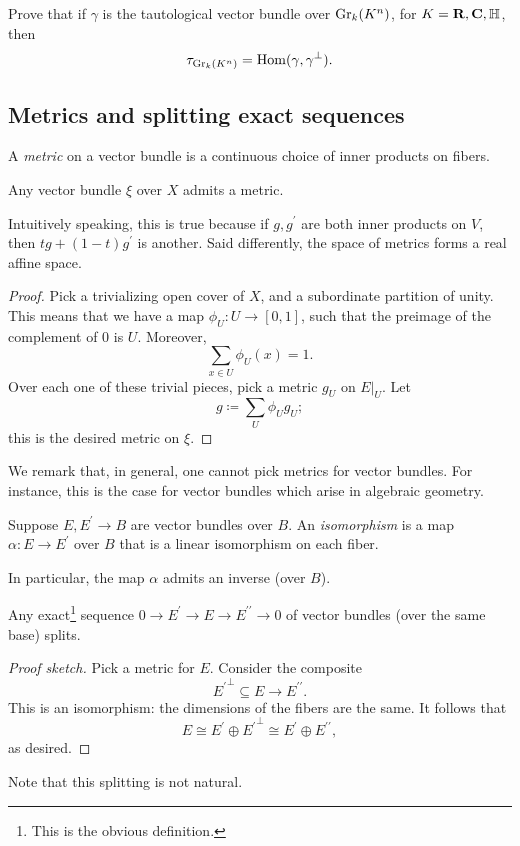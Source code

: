 \begin{exercise}
    Prove that if $\gamma$ is the tautological vector bundle over
    $\mathrm{Gr}_k(K^n)$, for $K=\mathbf R,\mathbf C,\mathbb H$, then
    $$\tau_{\mathrm{Gr}_k(K^n)} = \operatorname{Hom}(\gamma,\gamma^\perp).$$
\end{exercise}
\subsection{Metrics and splitting exact sequences}
A \emph{metric} on a vector bundle is a continuous choice of inner products on
fibers.
\begin{lemma}
    Any vector bundle $\xi$ over $X$ admits a metric.
\end{lemma}
Intuitively speaking, this is true because if $g,g^\prime$ are both inner
products on $V$, then $tg+(1-t)g^\prime$ is another. Said differently, the
space of metrics forms a real affine space.
\begin{proof}
    Pick a trivializing open cover of $X$, and a subordinate partition of
    unity. This means that we have a map $\phi_U:U\to [0,1]$, such that the
    preimage of the complement of $0$ is $U$. Moreover,
    $$\sum_{x\in U} \phi_U(x) = 1.$$
    Over each one of these trivial pieces, pick a metric $g_U$ on $E|_{U}$.
    Let
    $$g \coloneqq \sum_{U}\phi_U g_U;$$
    this is the desired metric on $\xi$.
\end{proof}
We remark that, in general, one cannot pick metrics for vector bundles. For
instance, this is the case for vector bundles which arise in algebraic
geometry.
\begin{definition}
    Suppose $E,E^\prime\to B$ are vector bundles over $B$. An
    \emph{isomorphism} is a map $\alpha:E\to E^\prime$ over $B$ that is a
    linear isomorphism on each fiber.
\end{definition}
In particular, the map $\alpha$ admits an inverse (over $B$).
\begin{corollary}
    Any exact\footnote{This is the obvious definition.} sequence $0\to
    E^\prime\to E\to E^{\prime\prime}\to 0$ of vector bundles (over the same
    base) splits.
\end{corollary}
\begin{proof}[Proof sketch]
    Pick a metric for $E$. Consider the composite
    $${E^\prime}^\perp\subseteq E\to E^{\prime\prime}.$$
    This is an isomorphism: the dimensions of the fibers are the same. It
    follows that
    $$E\cong E^\prime\oplus {E^\prime}^{\perp}\cong E^\prime\oplus
    E^{\prime\prime},$$
    as desired.
\end{proof}
Note that this splitting is not natural.
